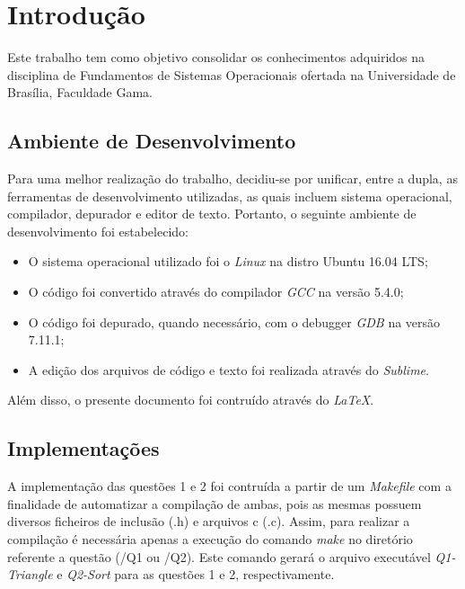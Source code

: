 \chapter[Introdução]{Introdução}

	Este trabalho tem como objetivo consolidar os conhecimentos adquiridos na disciplina de Fundamentos de Sistemas
	Operacionais ofertada na Universidade de Brasília, Faculdade Gama.

\section{Ambiente de Desenvolvimento}

	Para uma melhor realização do trabalho, decidiu-se por unificar, entre a dupla, as ferramentas de desenvolvimento
	utilizadas, as quais incluem sistema operacional, compilador, depurador e editor de texto. Portanto, o seguinte
	ambiente de desenvolvimento foi estabelecido:

	\begin{itemize}

		\item O sistema operacional utilizado foi o \textit{Linux} na distro Ubuntu 16.04 LTS;
		\item O código foi convertido através do compilador \textit{GCC} na versão 5.4.0;
		\item O código foi depurado, quando necessário, com o debugger \textit{GDB} na versão 7.11.1;
		\item A edição dos arquivos de código e texto foi realizada através do \textit{Sublime}.

	\end{itemize}

	Além disso, o presente documento foi contruído através do \textit{LaTeX}.

\section{Implementações}

	A implementação das questões 1 e 2 foi contruída a partir de um \textit{Makefile} com a finalidade de automatizar a
	compilação de ambas, pois as mesmas possuem diversos ficheiros de inclusão (.h) e arquivos c (.c). Assim, para
	realizar a compilação é necessária apenas a execução do comando \textit{make} no diretório referente a questão
	(/Q1 ou /Q2). Este comando gerará o arquivo executável \textit{Q1-Triangle} e \textit{Q2-Sort} para as questões 1 e 2,
	respectivamente.

